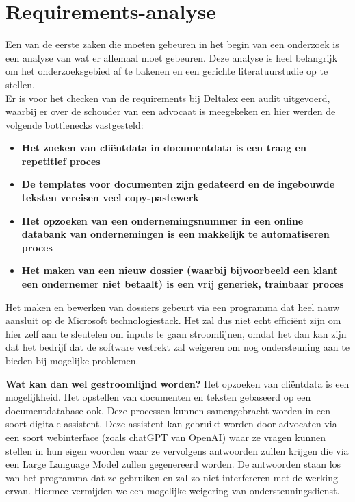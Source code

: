 \chapter{Requirements-analyse}
Een van de eerste zaken die moeten gebeuren in het begin van een onderzoek is een analyse van wat er allemaal moet gebeuren. 
Deze analyse is heel belangrijk om het onderzoeksgebied af te bakenen en een gerichte literatuurstudie op te stellen. \\ 

Er is voor het checken van de requirements bij Deltalex een audit uitgevoerd, waarbij er over de schouder van een advocaat is meegekeken en hier werden de volgende bottlenecks vastgesteld:
\begin{itemize}
	\item \textbf{Het zoeken van cliëntdata in documentdata is een traag en repetitief proces}
	\item \textbf{De templates voor documenten zijn gedateerd en de ingebouwde teksten vereisen veel copy-pastewerk}
	\item \textbf{Het opzoeken van een ondernemingsnummer in een online databank van ondernemingen is een makkelijk te automatiseren proces}
	\item \textbf{Het maken van een nieuw dossier (waarbij bijvoorbeeld een klant een ondernemer niet betaalt) is een vrij generiek, trainbaar proces}
\end{itemize}

Het maken en bewerken van dossiers gebeurt via een programma dat heel nauw aansluit op de Microsoft \Gls{technologiestack}. 
Het zal dus niet echt efficiënt zijn om hier zelf aan te sleutelen om inputs te gaan stroomlijnen, 
omdat het dan kan zijn dat het bedrijf dat de software vestrekt zal weigeren om nog ondersteuning aan te bieden bij mogelijke problemen. 

\textbf{Wat kan dan wel gestroomlijnd worden?}
Het opzoeken van cliëntdata is een mogelijkheid. 
Het opstellen van documenten en teksten gebaseerd op een documentdatabase ook. 
Deze processen kunnen samengebracht worden in een soort digitale assistent. 
Deze assistent kan gebruikt worden door advocaten via een soort webinterface (zoals chatGPT van OpenAI) waar ze vragen kunnen stellen in hun eigen woorden 
waar ze vervolgens antwoorden zullen krijgen die via een Large Language Model zullen gegenereerd worden. 
De antwoorden staan los van het programma dat ze gebruiken en zal zo niet interfereren met de werking ervan. 
Hiermee vermijden we een mogelijke weigering van ondersteuningsdienst. \\ 

